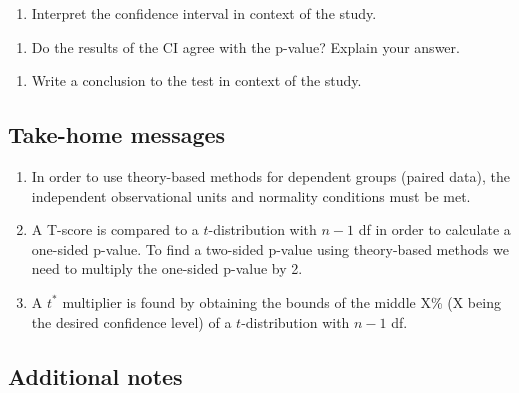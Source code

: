 \documentclass[
]{report}
\providecommand{\tightlist}{%
  \setlength{\itemsep}{0pt}\setlength{\parskip}{0pt}}
\begin{document}
\begin{enumerate}
\def\labelenumi{\arabic{enumi}.}
\setcounter{enumi}{13}
\tightlist
\item
  Interpret the confidence interval in context of the study.
\end{enumerate}

\vspace{1in}

\begin{enumerate}
\def\labelenumi{\arabic{enumi}.}
\setcounter{enumi}{14}
\tightlist
\item
  Do the results of the CI agree with the p-value? Explain your answer.
\end{enumerate}

\vspace{0.5in}

\begin{enumerate}
\def\labelenumi{\arabic{enumi}.}
\setcounter{enumi}{15}
\tightlist
\item
  Write a conclusion to the test in context of the study.
  \vspace{0.6in}
\end{enumerate}

\hypertarget{take-home-messages-16}{%
\subsection{Take-home messages}\label{take-home-messages-16}}

\begin{enumerate}
\def\labelenumi{\arabic{enumi}.}
\item
  In order to use theory-based methods for dependent groups (paired data), the independent observational units and normality conditions must be met.
\item
  A T-score is compared to a \(t\)-distribution with \(n - 1\) df in order to calculate a one-sided p-value. To find a two-sided p-value using theory-based methods we need to multiply the one-sided p-value by 2.
\item
  A \(t^*\) multiplier is found by obtaining the bounds of the middle X\% (X being the desired confidence level) of a \(t\)-distribution with \(n - 1\) df.
\end{enumerate}

\hypertarget{additional-notes-16}{%
\subsection{Additional notes}\label{additional-notes-16}}
\end{document}
